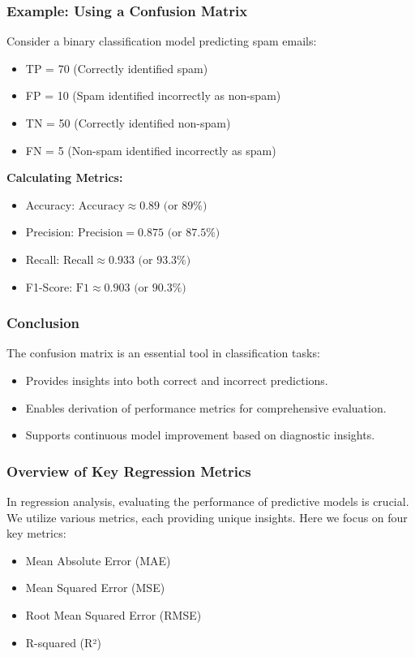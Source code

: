 \documentclass{beamer}
\begin{document}
\begin{frame}[fragile]
    \frametitle{Example: Using a Confusion Matrix}
    Consider a binary classification model predicting spam emails:
    \begin{itemize}
        \item TP = 70 (Correctly identified spam)
        \item FP = 10 (Spam identified incorrectly as non-spam)
        \item TN = 50 (Correctly identified non-spam)
        \item FN = 5 (Non-spam identified incorrectly as spam)
    \end{itemize}
    
    \textbf{Calculating Metrics:}
    \begin{itemize}
        \item Accuracy: $\text{Accuracy} \approx 0.89 \text{ (or 89\%)}$
        \item Precision: $\text{Precision} = 0.875 \text{ (or 87.5\%)}$
        \item Recall: $\text{Recall} \approx 0.933 \text{ (or 93.3\%)}$
        \item F1-Score: $\text{F1} \approx 0.903 \text{ (or 90.3\%)}$
    \end{itemize}
\end{frame}

\begin{frame}[fragile]
    \frametitle{Conclusion}
    The confusion matrix is an essential tool in classification tasks:
    \begin{itemize}
        \item Provides insights into both correct and incorrect predictions.
        \item Enables derivation of performance metrics for comprehensive evaluation.
        \item Supports continuous model improvement based on diagnostic insights.
    \end{itemize}
\end{frame}

\begin{frame}[fragile]
    \frametitle{Overview of Key Regression Metrics}
    In regression analysis, evaluating the performance of predictive models is crucial. We utilize various metrics, each providing unique insights. Here we focus on four key metrics: 
    \begin{itemize}
        \item Mean Absolute Error (MAE)
        \item Mean Squared Error (MSE)
        \item Root Mean Squared Error (RMSE)
        \item R-squared (R²)
    \end{itemize}
\end{frame}
\end{document}
